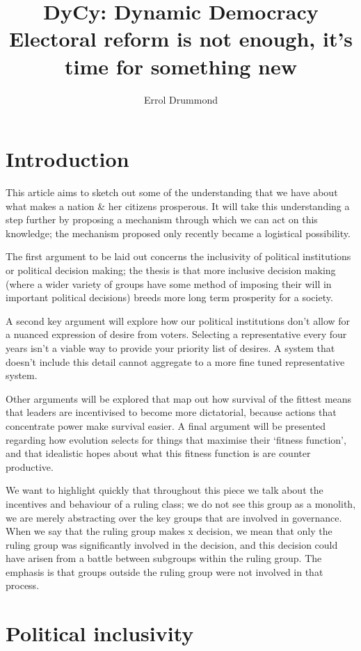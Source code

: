 \documentclass[twoside]{article}
\title{DyCy: Dynamic Democracy \\ \small Electoral reform is not enough, it’s time for something new}
\author{Errol Drummond}
\date{}
\theoremstyle{definition}
\begin{document}
	\maketitle

\section{Introduction}

This article aims to sketch out some of the understanding that we have about what makes a nation \& her citizens prosperous. It will take this understanding a step further by proposing a mechanism through which we can act on this knowledge; the mechanism proposed only recently became a logistical possibility.

The first argument to be laid out concerns the inclusivity of political institutions or political decision making; the thesis is that more inclusive decision making (where a wider variety of groups have some method of imposing their will in important political decisions) breeds more long term prosperity for a society.

A second key argument will explore how our political institutions don’t allow for a nuanced expression of desire from voters. Selecting a representative every four years isn’t a viable way to provide your priority list of desires. A system that doesn’t include this detail cannot aggregate to a more fine tuned representative system.

Other arguments will be explored that map out how survival of the fittest means that leaders are incentivised to become more dictatorial, because actions that concentrate power make survival easier. A final argument will be presented regarding how evolution selects for things that maximise their ‘fitness function’, and that idealistic hopes about what this fitness function is are counter productive. 

We want to highlight quickly that throughout this piece we talk about the incentives and behaviour of a ruling class; we do not see this group as a monolith, we are merely abstracting over the key groups that are involved in governance. When we say that the ruling group makes x decision, we mean that only the ruling group was significantly involved in the decision, and this decision could have arisen from a battle between subgroups within the ruling group. The emphasis is that groups outside the ruling group were not involved in that process.

\section{Political inclusivity}
\end{document}
